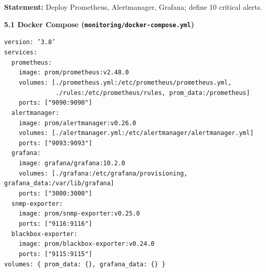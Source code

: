 \documentclass[11pt]{article}
\begin{document}
\begin{exoresolu}
\textbf{Statement:} Deploy Prometheus, Alertmanager, Grafana; define 10 critical alerts.

\tcblower
\textbf{5.1 Docker Compose (\texttt{monitoring/docker-compose.yml})}\par
\texttt{version: '3.8'}\\
\texttt{services:}\\
\texttt{\ \ prometheus:}\\
\texttt{\ \ \ \ image: prom/prometheus:v2.48.0}\\
\texttt{\ \ \ \ volumes: [./prometheus.yml:/etc/prometheus/prometheus.yml,}\\
\texttt{\ \ \ \ \ \ \ \ \ \ \ \ \ \ ./rules:/etc/prometheus/rules, prom\_data:/prometheus]}\\
\texttt{\ \ \ \ ports: ["9090:9090"]}\\
\texttt{\ \ alertmanager:}\\
\texttt{\ \ \ \ image: prom/alertmanager:v0.26.0}\\
\texttt{\ \ \ \ volumes: [./alertmanager.yml:/etc/alertmanager/alertmanager.yml]}\\
\texttt{\ \ \ \ ports: ["9093:9093"]}\\
\texttt{\ \ grafana:}\\
\texttt{\ \ \ \ image: grafana/grafana:10.2.0}\\
\texttt{\ \ \ \ volumes: [./grafana:/etc/grafana/provisioning, grafana\_data:/var/lib/grafana]}\\
\texttt{\ \ \ \ ports: ["3000:3000"]}\\
\texttt{\ \ snmp-exporter:}\\
\texttt{\ \ \ \ image: prom/snmp-exporter:v0.25.0}\\
\texttt{\ \ \ \ ports: ["9116:9116"]}\\
\texttt{\ \ blackbox-exporter:}\\
\texttt{\ \ \ \ image: prom/blackbox-exporter:v0.24.0}\\
\texttt{\ \ \ \ ports: ["9115:9115"]}\\
\texttt{volumes: \{ prom\_data: \{\}, grafana\_data: \{\} \}}


\end{exoresolu}
\end{document}
